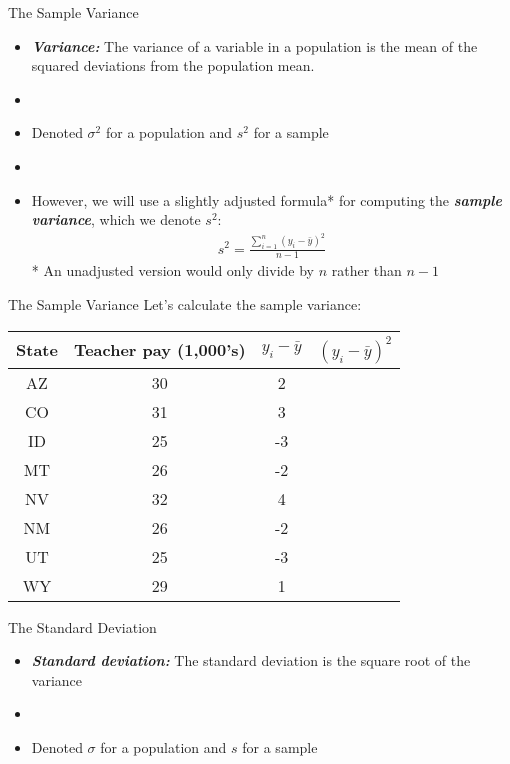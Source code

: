 \documentclass[xcolor=dvipsnames]{beamer}
\begin{document}
\begin{frame}{The Sample Variance}
\begin{itemize}
	\item \emph{\textbf{Variance:}} The variance of a variable in a population is the mean of the squared deviations from the population mean.
	\item[]
	\item Denoted $\sigma^2$ for a population and $s^2$ for a sample 
	\item[]
	\item However, we will use a slightly adjusted formula* for computing the \textbf{\emph{sample variance}}, which we denote $s^2$:
	\begin{gather*}
		s^2 = \frac{\sum_{i=1}^n (y_i - \bar{y})^2}{n-1}
	\end{gather*}
	* An unadjusted version would only divide by $n$ rather than $n-1$
\end{itemize}
\end{frame}

\begin{frame}{The Sample Variance}
 Let's calculate the sample variance:
		\begin{center}
			\begin{tabular}{|c|c|c|c|}
				\hline 
				\textbf{State} & \textbf{Teacher pay (1,000's)} &  $y_i-\bar{y}$ & $(y_i-\bar{y})^2$\\ 
				\hline \hline
				AZ & 30 & 2 &\\ \hline 
				CO &  31 & 3 &\\ \hline 
				ID & 25  & -3 &\\  \hline 
				MT &  26 & -2 &\\ \hline 
				NV & 32 & 4 &\\ \hline 
				NM &  26 & -2 &\\ \hline 
				UT &  25 & -3 &\\ \hline 
				WY &  29 & 1 &\\ \hline 
			\end{tabular} 
		\end{center}
\end{frame}

\begin{frame}{The Standard Deviation}
	\begin{itemize}
		\item \textbf{\emph{Standard deviation:}} The standard deviation is the square root of the variance 
		\item[]
		\item Denoted $\sigma$ for a population and $s$ for a sample
	\end{itemize}
\end{frame}
\end{document}
